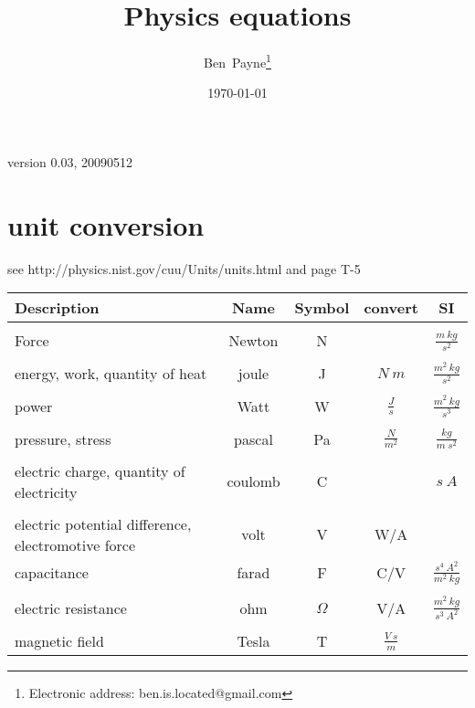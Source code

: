 \documentclass[12pt]{article}  %
\begin{document}
\title{Physics equations}
\author{Ben~Payne\footnote{Electronic address: ben.is.located@gmail.com}}
\date{\today}

\thispagestyle{empty}  %
\pagestyle{empty} %

version 0.03, 20090512

\section{unit conversion}


see http://physics.nist.gov/cuu/Units/units.html and \cite{ZemanskyYoungGen} page T-5 \\

\begin{tabular}{lcccc}
Description                    & Name    & Symbol   & convert          & SI \\
\hline
\\[0.1pt]
Force                          & Newton  & N        &                   & $\frac{m \ kg}{s^2}$  \\
\\[0.1pt]
energy, work, quantity of heat & joule   & J        & $N \ m$            & $\frac{m^2 \ kg}{s^2}$ \\
\\[0.1pt]
power                          & Watt    & W        & $\frac{J}{s}$      & $\frac{m^2 \ kg}{s^3}$ \\
\\[0.1pt]
pressure, stress               & pascal  & Pa       & $\frac{N}{m^2}$    & $\frac{kg}{m \ s^2}$ \\
\\[0.1pt]
electric charge, 
quantity of electricity        & coulomb & C        &                   & $s \ A$ \\ %
\\[0.1pt]
electric potential difference,
electromotive force            & volt    & V        & W/A  %
\\[0.1pt]
capacitance                    & farad   & F        & C/V             & $\frac{s^4 \ A^2}{m^2 \ kg}$ \\
\\[0.1pt]
electric resistance            & ohm     & $\Omega$ & V/A             & $\frac{m^2 \ kg}{s^3 \ A^2}$ \\
\\[0.1pt]
magnetic field                 & Tesla   & T        & $\frac{V \ s}{m}$  %
\end{tabular}
\end{document}
